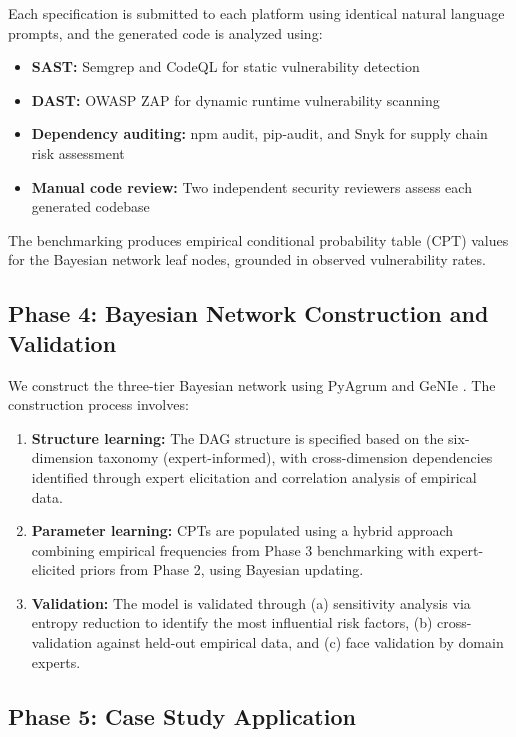 \documentclass[preprint,review,12pt]{elsarticle}
\begin{document}
Each specification is submitted to each platform using identical natural language prompts, and the generated code is analyzed using:
\begin{itemize}
    \item \textbf{SAST:} Semgrep \cite{semgrep2024} and CodeQL \cite{codeql2024} for static vulnerability detection
    \item \textbf{DAST:} OWASP ZAP \cite{owaspzap2024} for dynamic runtime vulnerability scanning
    \item \textbf{Dependency auditing:} npm audit, pip-audit, and Snyk for supply chain risk assessment
    \item \textbf{Manual code review:} Two independent security reviewers assess each generated codebase
\end{itemize}

The benchmarking produces empirical conditional probability table (CPT) values for the Bayesian network leaf nodes, grounded in observed vulnerability rates.


\subsection{Phase 4: Bayesian Network Construction and Validation}
\label{subsec:phase4}

We construct the three-tier Bayesian network using PyAgrum \cite{brouillard2020pyagrum} and GeNIe \cite{genie2024}. The construction process involves:

\begin{enumerate}
    \item \textbf{Structure learning:} The DAG structure is specified based on the six-dimension taxonomy (expert-informed), with cross-dimension dependencies identified through expert elicitation and correlation analysis of empirical data.
    \item \textbf{Parameter learning:} CPTs are populated using a hybrid approach combining empirical frequencies from Phase 3 benchmarking with expert-elicited priors from Phase 2, using Bayesian updating.
    \item \textbf{Validation:} The model is validated through (a) sensitivity analysis via entropy reduction \cite{marcot2012metrics, marcot2019advances} to identify the most influential risk factors, (b) cross-validation against held-out empirical data, and (c) face validation by domain experts.
\end{enumerate}


\subsection{Phase 5: Case Study Application}
\label{subsec:phase5}
\end{document}
